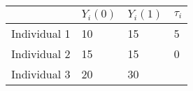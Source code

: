 \documentclass[]{article}
\begin{document}
\begin{longtable}[]{@{}llll@{}}
\toprule
\begin{minipage}[b]{0.20\columnwidth}\raggedright\strut
\strut
\end{minipage} & \begin{minipage}[b]{0.16\columnwidth}\raggedright\strut
\(Y_{i}(0)\)\strut
\end{minipage} & \begin{minipage}[b]{0.16\columnwidth}\raggedright\strut
\(Y_{i}(1)\)\strut
\end{minipage} & \begin{minipage}[b]{0.16\columnwidth}\raggedright\strut
\(\tau_i\)\strut
\end{minipage}\tabularnewline
\midrule
\endhead
\begin{minipage}[t]{0.20\columnwidth}\raggedright\strut
Individual 1\strut
\end{minipage} & \begin{minipage}[t]{0.16\columnwidth}\raggedright\strut
10\strut
\end{minipage} & \begin{minipage}[t]{0.16\columnwidth}\raggedright\strut
15\strut
\end{minipage} & \begin{minipage}[t]{0.16\columnwidth}\raggedright\strut
5\strut
\end{minipage}\tabularnewline
\begin{minipage}[t]{0.20\columnwidth}\raggedright\strut
Individual 2\strut
\end{minipage} & \begin{minipage}[t]{0.16\columnwidth}\raggedright\strut
15\strut
\end{minipage} & \begin{minipage}[t]{0.16\columnwidth}\raggedright\strut
15\strut
\end{minipage} & \begin{minipage}[t]{0.16\columnwidth}\raggedright\strut
0\strut
\end{minipage}\tabularnewline
\begin{minipage}[t]{0.20\columnwidth}\raggedright\strut
Individual 3\strut
\end{minipage} & \begin{minipage}[t]{0.16\columnwidth}\raggedright\strut
20\strut
\end{minipage} & \begin{minipage}[t]{0.16\columnwidth}\raggedright\strut
30\strut
\end{minipage} & \begin{minipage}[t]{0.16\columnwidth}\raggedright\strut

\end{minipage}
\end{longtable}
\end{document}
